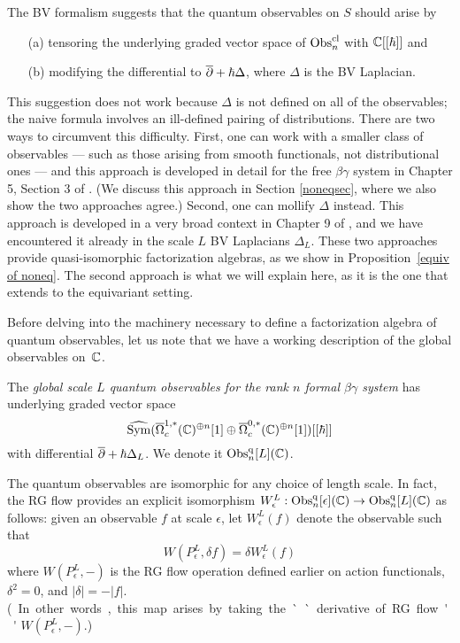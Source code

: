 The BV formalism suggests that the quantum observables on $S$ should arise by 
\begin{enumerate}
\item[(a)] tensoring the underlying graded vector space of ${\rm Obs}^{\rm cl}_n$ with $\mathbb C[[\hbar]]$ and
\item[(b)] modifying the differential to $\overline{\partial} +\hbar \Delta$, where $\Delta$ is the BV Laplacian.
\end{enumerate}
This suggestion does not work because $\Delta$ is not defined on all of the observables;
the naive formula involves an ill-defined pairing of distributions.
There are two ways to circumvent this difficulty. 
First, one can work with a smaller class of observables --- such as those arising from smooth functionals, not distributional ones --- and this approach is developed in detail for the free $\beta\gamma$ system in Chapter 5, Section 3 of \cite{CG1}.
(We discuss this approach in Section \ref{noneqsec}, where we also show the two approaches agree.) 
Second, one can mollify $\Delta$ instead.
This approach is developed in a very broad context in Chapter 9 of \cite{CG2},
and we have encountered it already in the scale $L$ BV Laplacians $\Delta_L$.
These two approaches provide quasi-isomorphic factorization algebras, 
as we show in Proposition~\ref{equiv of noneq}. The second approach is what we will explain here, as it is the one that extends to the equivariant setting.


Before delving into the machinery necessary to define a factorization algebra of quantum observables,
let us note that we have a working description of the global observables on~$\mathbb C$.

\begin{dfn}
The \emph{global scale $L$ quantum observables for the rank $n$ formal $\beta\gamma$ system} has
underlying graded vector space
\[
\widehat{{\rm Sym}}(\overline{\Omega}^{1,*}_c(\mathbb C)^{\oplus n}[1] \oplus \overline{\Omega}^{0,*}_c(\mathbb C)^{\oplus n}[1])[[\hbar]]
\]
with differential $\overline{\partial} + \hbar \Delta_L$. 
We denote it ${\rm Obs}^{\rm q}_n[L](\mathbb C)$.
\end{dfn}

The quantum observables are isomorphic for any choice of length scale.
In fact, the RG flow provides an explicit isomorphism $W_\epsilon^L: {\rm Obs}^{\rm q}_n[\epsilon](\mathbb C) \to {\rm Obs}^{\rm q}_n[L](\mathbb C)$ as follows: 
given an observable $f$ at scale $\epsilon$, let $W_\epsilon^L(f)$ denote the observable such that
\[
W(P_\epsilon^L, \delta f) = \delta W_\epsilon^L(f)
\]
where $W(P_\epsilon^L, -)$ is the RG flow operation defined earlier on action functionals, 
$\delta^2=0$,  and $|\delta| = - |f|$. \si
(In other words, this map arises by taking the ``derivative of RG flow'' $W(P_\epsilon^L, -)$.)

